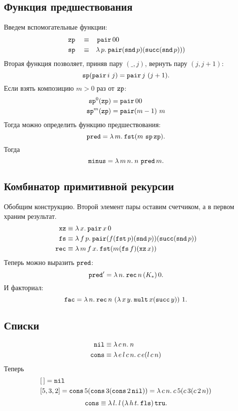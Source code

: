 \documentclass[11pt,a4paper]{article}
\begin{document}
\subsection{Функция предшествования}
Введем вспомогательные функции:
\[
\begin{aligned}
	& \zp && \equiv && \pair 0 0 \\
	& \fpsp && \equiv && \lam{p}{\pair (\snd p) (\fpsucc (\snd p)))}
\end{aligned}
\]
Вторая функция позволяет, приняв пару $ (\_, j)$, вернуть пару  $ (j, j+1)$:
 \[
	 \fpsp(\pair i~ j) = \pair j~ (j+1)
.\] 
Если взять композицию $ m > 0$ раз от $\zp$:
\[
\begin{aligned}
	\fpsp^{0} (\zp) & = \pair 0 0 \\
	\fpsp^{m}(\zp) &= \pair (m-1)~ m
\end{aligned}
\]
Тогда можно определить функцию предшествования:
\[
	\fppred = \lam{m}{\fst (m \, \fpsp \zp)}
.\] 
Тогда 
\[
	\fpminus = \lam{m\,n}{n\, \fppred m}
.\] 

\subsection{Комбинатор примитивной рекурсии}
Обобщим конструкцию. Второй элемент пары оставим счетчиком, а в первом храним результат.
\[
\begin{aligned}
	\fpxz & \equiv \lam{x}{\pair x \, 0} \\
	\fpfs & \equiv \lam {f \, p}{\pair (f (\fst p) (\snd p)) (\fpsucc (\snd p))} \\
	\fprec & \equiv \lam{m\,f\,x}{\fst (m (\fpfs f) (\fpxz x))}
\end{aligned}
\]
Теперь можно выразить $ \fppred$:
 \[
	 \fppred' = \lam{n}{\fprec n\, (K_{*})\, 0}
.\] 
И факториал:
\[
	\fac = \lam{n}{\fprec n \, \left( \lam{x\,y}{\fpmult x (\fpsucc y)} \right) \, 1}
.\] 

\subsection{Списки}
\[
\begin{aligned}
	\nil & \equiv \lam{c\, n}{n} \\
	\cons &\equiv \lam{e\,l\,c\,n}{c \, e (l\, c\, n)}
\end{aligned}
\]
Теперь
\[
\begin{aligned}
	&[\,] = \nil \\
	&[5,3,2] = \cons 5 (\cons 3 (\cons 2 \nil)) = \lam{c\,n}{c\,5(c\,3(c\,2\,n))}
\end{aligned}
\]
\[
	\isempty \equiv \lam{l}{l \, (\lam{h\,t}{\fls}) \tru}
.\] 
\end{document}
